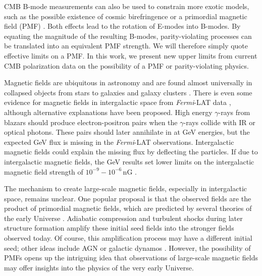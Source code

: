 \documentclass[apj]{emulateapj}
\newcommand{\fermilat}{\textit{Fermi}-LAT}
\begin{document}
CMB B-mode measurements can also be used to constrain more exotic models, such as the possible existence of cosmic birefringence \citep{carroll98,lue99} or a primordial magnetic field (PMF) \citep{kosowsky96, seshadri01}.  
Both effects lead to the rotation of E-modes into B-modes. 
By equating the magnitude of the resulting B-modes, parity-violating processes can be translated into an equivalent PMF strength. 
We will therefore simply quote effective limits on a PMF. 
In this work, we present new upper limits from current CMB polarization data on the possibility of a PMF or parity-violating physics. 

Magnetic fields are ubiquitous in astronomy and are found almost universally in collapsed objects from stars to galaxies and galaxy clusters \citep[for review, see][]{ryu12, widrow12}. 
There is even some evidence for magnetic fields in intergalactic space from \fermilat{} data \citep{neronov10}, although alternative explanations \citep{broderick12} have been proposed. 
High energy $\gamma$-rays from blazars should  produce electron-positron pairs when the $\gamma$-rays collide with IR or optical photons. 
These pairs should later annihilate in at GeV energies, but the expected GeV flux is missing in the \fermilat{} observations. 
Intergalactic magnetic fields could explain the missing flux by deflecting the particles. 
If due to intergalactic magnetic fields, the GeV results set lower limits on the intergalactic magnetic field strength of $10^{-9} - 10^{-6}$\,nG \citep{tavecchio10,taylor11,dermer11,vovk12}. 

The mechanism to create large-scale magnetic fields, especially in intergalactic space, remains unclear. 
One popular proposal is that the observed fields are the product of primordial magnetic fields, which are predicted by several theories of the early Universe \citep[e.g.,][]{turner88, grasso98,ichiki06}. 
Adiabatic compression and turbulent shocks during later structure formation amplify these initial seed fields into the stronger fields observed today. 
Of course, this amplification process may have a different initial seed; other ideas include AGN or galactic dynamos \citep[for a review, see][]{giovannini04}. 
However, the possibility of PMFs opens up the intriguing idea that observations of large-scale magnetic fields may offer insights into the physics of the very early Universe. 
\end{document}
